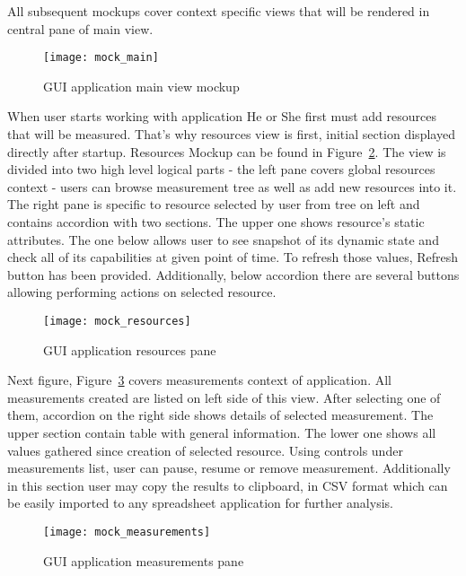 All subsequent mockups cover context specific views that will be rendered in central pane of main view.

\begin{figure}[ht]
\centering
\texttt{[image: mock\_main]}
\caption{GUI application main view mockup}
\label{fig:mock_main}
\end{figure}

When user starts working with application He or She first must add resources that will be measured. That's why resources view is first, initial section displayed directly after startup. Resources Mockup can be found in Figure~\ref{fig:mock_resources}. The view is divided into two high level logical parts - the left pane covers global resources context - users can browse measurement tree as well as add new resources into it. The right pane is specific to resource selected by user from tree on left and contains accordion with two sections. The upper one shows resource\rq{}s static attributes. The one below allows user to see snapshot of its dynamic state and check all of its capabilities at given point of time. To refresh those values, Refresh button has been provided. Additionally, below accordion there are several buttons allowing performing actions on selected resource.

\begin{figure}[ht]
\centering
\texttt{[image: mock\_resources]}
\caption{GUI application resources pane}
\label{fig:mock_resources}
\end{figure}

Next figure, Figure~\ref{fig:mock_measurements} covers measurements context of application. All measurements created are listed on left side of this view. After selecting one of them, accordion on the right side shows details of selected measurement. The upper section contain table with general information. The lower one shows all values gathered since creation of selected resource. Using controls under measurements list, user can pause, resume or remove measurement. Additionally in this section user may copy the results to clipboard, in CSV format which can be easily imported to any spreadsheet application for further analysis. 

\begin{figure}[ht]
\centering
\texttt{[image: mock\_measurements]}
\caption{GUI application measurements pane}
\label{fig:mock_measurements}
\end{figure}

